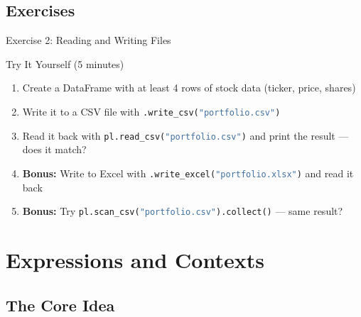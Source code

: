 \documentclass[9pt,aspectratio=169]{beamer}
\newcommand{\py}[1]{\lstinline[language=Python]{#1}}
\begin{document}
\subsection{Exercises}
\begin{frame}[fragile]{Exercise 2: Reading and Writing Files}

\begin{alertblock}{Try It Yourself (5 minutes)}
\begin{enumerate}
    \item Create a DataFrame with at least 4 rows of stock data (ticker, price, shares)
    \item Write it to a CSV file with \py{.write_csv("portfolio.csv")}
    \item Read it back with \py{pl.read_csv("portfolio.csv")} and print the result --- does it match?
    \item \textbf{Bonus:} Write to Excel with \py{.write_excel("portfolio.xlsx")} and read it back
    \item \textbf{Bonus:} Try \py{pl.scan_csv("portfolio.csv").collect()} --- same result?
\end{enumerate}
\end{alertblock}

\end{frame}


\section{Expressions and Contexts}
\subsection{The Core Idea}
\end{document}
